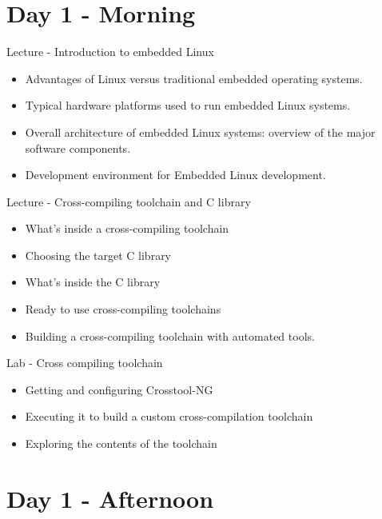 \documentclass[a4paper,12pt,obeyspaces,spaces,hyphens]{article}
\begin{document}
\section{Day 1 - Morning}

\feagendaonecolumn
{Lecture - Introduction to embedded Linux}
{
  \begin{itemize}
  \item Advantages of Linux versus traditional embedded operating
    systems.
  \item Typical hardware platforms used to run embedded Linux systems.
  \item Overall architecture of embedded Linux systems: overview of
    the major software components.
  \item Development environment for Embedded Linux development.
  \end{itemize}
}

\feagendatwocolumn
{Lecture - Cross-compiling toolchain and C library}
{
  \begin{itemize}
  \item What's inside a cross-compiling toolchain
  \item Choosing the target C library
  \item What's inside the C library
  \item Ready to use cross-compiling toolchains
  \item Building a cross-compiling toolchain with automated tools.
  \end{itemize}
}
{Lab - Cross compiling toolchain}
{
  \begin{itemize}
  \item Getting and configuring Crosstool-NG
  \item Executing it to build a custom cross-compilation toolchain
  \item Exploring the contents of the toolchain
  \end{itemize}
}

\section{Day 1 - Afternoon}
\end{document}

